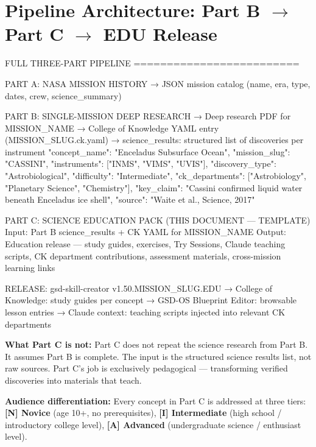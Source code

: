 \documentclass[11pt,letterpaper]{article}
\begin{document}
\thispagestyle{fancy}
\section*{Pipeline Architecture: Part B $\rightarrow$ Part C $\rightarrow$ EDU Release}

\begin{asciibox}
FULL THREE-PART PIPELINE
=========================

PART A: NASA MISSION HISTORY
  → JSON mission catalog (name, era, type, dates, crew, science_summary)

PART B: SINGLE-MISSION DEEP RESEARCH
  → Deep research PDF for {MISSION_NAME}
  → College of Knowledge YAML entry ({MISSION_SLUG}.ck.yaml)
  → science_results: structured list of discoveries per instrument
    {
      "concept_name":    "Enceladus Subsurface Ocean",
      "mission_slug":    "CASSINI",
      "instruments":     ["INMS", "VIMS", "UVIS"],
      "discovery_type":  "Astrobiological",
      "difficulty":      "Intermediate",
      "ck_departments":  ["Astrobiology", "Planetary Science", "Chemistry"],
      "key_claim":       "Cassini confirmed liquid water beneath Enceladus ice shell",
      "source":          "Waite et al., Science, 2017"
    }

PART C: SCIENCE EDUCATION PACK (THIS DOCUMENT — TEMPLATE)
  Input:  Part B science_results + CK YAML for {MISSION_NAME}
  Output: Education release — study guides, exercises, Try Sessions,
          Claude teaching scripts, CK department contributions,
          assessment materials, cross-mission learning links

RELEASE: gsd-skill-creator v1.50.{MISSION_SLUG}.EDU
  → College of Knowledge: study guides per concept
  → GSD-OS Blueprint Editor: browsable lesson entries
  → Claude context: teaching scripts injected into relevant CK departments
\end{asciibox}

\textbf{What Part C is not:} Part C does not repeat the science research from Part B. It assumes Part B is complete. The input is the structured science results list, not raw sources. Part C's job is exclusively pedagogical --- transforming verified discoveries into materials that teach.

\textbf{Audience differentiation:} Every concept in Part C is addressed at three tiers:
\textcolor{novice}{\textbf{[N] Novice}} (age 10+, no prerequisites),
\textcolor{intermediate}{\textbf{[I] Intermediate}} (high school / introductory college level),
\textcolor{advanced}{\textbf{[A] Advanced}} (undergraduate science / enthusiast level).
\end{document}
